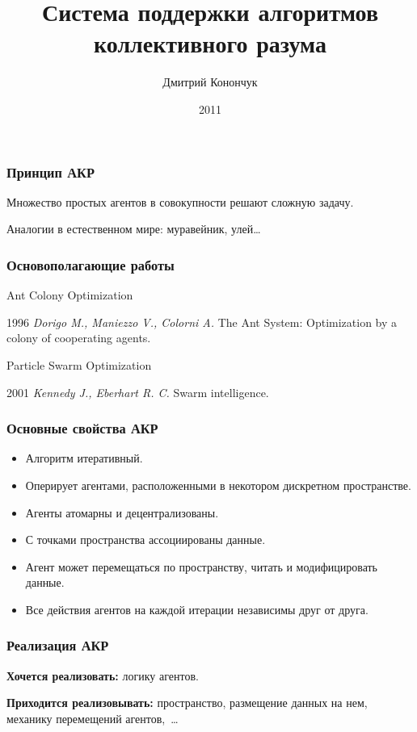 \documentclass[14pt]{beamer}
\title{Система поддержки алгоритмов коллективного разума}
\author[Конончук Д.О.]{Дмитрий Конончук}
\institute{
    Уральский Федеральный Университет \vspace{0.9em}

    Научный руководитель: Окуловский Юрий Сергеевич \vspace{0.9em}
}
\date{\footnotesize 2011}
\begin{document}
\begin{frame}
    \titlepage
\end{frame}

\begin{frame}
    \frametitle{Принцип АКР}
    Множество простых агентов в совокупности решают сложную задачу.

    \vspace{2ex}
    Аналогии в естественном мире: муравейник, улей\dots
\end{frame}

\begin{frame}
    \frametitle{Основополагающие работы}
    \begin{center}
        {\fontsize{16pt}{16pt}Ant Colony Optimization}

        {\small
            1996 {\it Dorigo M., Maniezzo V., Colorni A.} The Ant System: Optimization by a colony of cooperating agents.
        }

        \vspace{6ex}
        {\fontsize{16pt}{16pt}Particle Swarm Optimization}

        {\small
            2001 {\it Kennedy J., Eberhart R. C.} Swarm intelligence.
        }
    \end{center}
\end{frame}

\begin{frame}
    \frametitle{Основные свойства АКР}
    \begin{itemize}
        \item Алгоритм итеративный.
        \item Оперирует агентами, расположенными в некотором дискретном пространстве.
        \item Агенты атомарны и децентрализованы.
        \item С точками пространства ассоциированы данные.
        \item Агент может перемещаться по пространству, читать и модифицировать данные.
        \item Все действия агентов на каждой итерации независимы друг от друга.
    \end{itemize}
\end{frame}

\begin{frame}
    \frametitle{Реализация АКР}
    {\bf Хочется реализовать: } логику агентов.

    \vspace{2ex}
    \pause
    {\bf Приходится реализовывать: } пространство, размещение данных на нем, механику перемещений агентов,~\dots
\end{frame}
\end{document}
